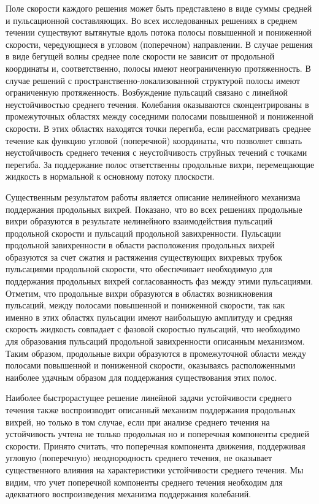 Поле скорости каждого решения может быть представлено в виде суммы средней и пульсационной составляющих. Во всех исследованных решениях в среднем течении существуют вытянутые вдоль потока полосы повышенной и пониженной скорости, чередующиеся в угловом (поперечном) направлении. В случае решения в виде бегущей волны среднее поле скорости не зависит от продольной координаты и, соответственно, полосы имеют неограниченную протяженность. В случае решений с пространственно-локализованной структурой полосы имеют ограниченную протяженность. Возбуждение пульсаций связано с линейной неустойчивостью среднего течения. Колебания оказываются сконцентрированы в промежуточных областях между соседними полосами повышенной и пониженной скорости. В этих областях находятся точки перегиба, если рассматривать среднее течение как функцию угловой (поперечной) координаты, что позволяет связать неустойчивость среднего течения с неустойчивость струйных течений с точками перегиба. За поддержание полос ответственны продольные вихри, перемещающие жидкость в нормальной к основному потоку плоскости. 

Существенным результатом работы является описание нелинейного механизма поддержания продольных вихрей. Показано, что во всех решениях продольные вихри образуются в результате нелинейного взаимодействия пульсаций продольной скорости и пульсаций продольной завихренности. Пульсации продольной завихренности в области расположения продольных вихрей образуются за счет сжатия и растяжения существующих вихревых трубок пульсациями продольной скорости, что обеспечивает необходимую для поддержания продольных вихрей согласованность фаз между этими пульсациями. Отметим, что продольные вихри образуются в областях возникновения пульсаций, между полосами повышенной и пониженной скорости, так как именно в этих областях пульсации имеют наибольшую амплитуду и средняя скорость жидкость совпадает с фазовой скоростью пульсаций, что необходимо для образования пульсаций продольной завихренности описанным механизмом. Таким образом, продольные вихри образуются в промежуточной области между полосами повышенной и пониженной скорости, оказываясь расположенными наиболее удачным образом для поддержания существования этих полос. 

Наиболее быстрорастущее решение линейной задачи устойчивости среднего течения также воспроизводит описанный механизм поддержания продольных вихрей, но только в том случае, если при анализе среднего течения на устойчивость учтена не только продольная но и поперечная компоненты средней скорости. Принято считать, что поперечная компонента движения, поддерживая угловую (поперечную) неоднородность среднего течения, не оказывает существенного влияния на характеристики устойчивости среднего течения. Мы видим, что учет поперечной компоненты среднего течения необходим для адекватного воспроизведения механизма поддержания колебаний. 

